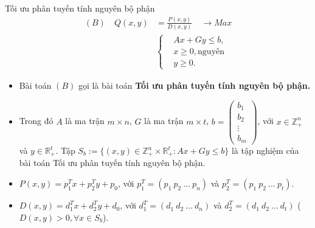 \documentclass[10pt]{beamer}
\begin{document}
\begin{frame}{Tối ưu phân tuyến tính nguyên bộ phận}
\vspace{-1cm}
\large
\begin{equation}
    \begin{split}
    (B) \quad Q(x,y) & = \frac{P(x,y)}{D(x,y)} \quad \longrightarrow Max \\
        & \left\{
        \begin{split}
        &Ax + Gy \leq  b, \\
        &x \geq 0, \text{nguyên} \\
        &y \geq 0.
        \end{split}
        \right.    
    \end{split}
\end{equation}            
\end{frame}
\begin{frame}
\begin{itemize}
\item Bài toán $(B)$ gọi là bài toán \textbf{Tối ưu phân tuyến tính nguyên bộ phận.}
\medskip
\item Trong đó $A$ là ma trận $m\times n$, $G$ là ma trận $m\times t$, $b=\begin{pmatrix}
    b_1 \\
    b_2 \\
    \vdots \\
    b_m
    \end{pmatrix}$, với $x\in \mathbb{Z}^n_+$ và $y \in \mathbb{R}^t_+$. Tập $S_b:=\{(x,y)\in \mathbb{Z}^n_+ \times \mathbb{R}^t_+: Ax+Gy\leq b\}$ là tập nghiệm của bài toán Tối ưu phân tuyến tính nguyên bộ phận. 
\medskip
\item $P(x,y)=p^T_1x+p^T_2y+p_0$, với $p^T_1 = (p_1 \: p_2 \: \ldots \: p_n)$ và $p^T_2 = (p_1 \: p_2 \: \ldots \: p_t)$.
\medskip
\item $D(x,y)=d^T_1x+d^T_2y+d_0$, với $d^T_1 = (d_1 \: d_2 \: \ldots \: d_n)$ và $d^T_2 = (d_1 \: d_2 \: \ldots \: d_t)$ ($D(x,y)>0, \forall x \in S_b$).
\end{itemize}
\end{frame}
\begin{frame}

    \bigskip
\end{frame}
\end{document}
